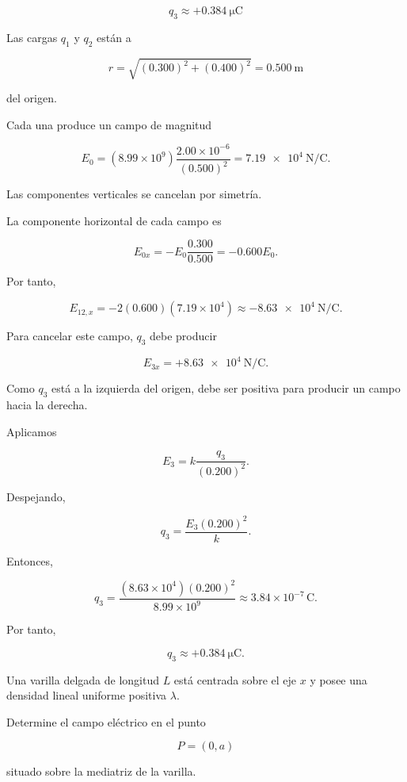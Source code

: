 \begin{respuesta}

\[
\boxed{q_3\approx+\SI{0.384}{\micro\coulomb}}
\]

\end{respuesta}

\begin{explicacion}

Las cargas \(q_1\) y \(q_2\) están a

\[
r=\sqrt{(0.300)^2+(0.400)^2}=\SI{0.500}{\metre}
\]

del origen.

Cada una produce un campo de magnitud

\[
E_0=(8.99\times10^9)\frac{2.00\times10^{-6}}{(0.500)^2}
=\SI{7.19e4}{\newton\per\coulomb}.
\]

Las componentes verticales se cancelan por simetría.

La componente horizontal de cada campo es

\[
E_{0x}=-E_0\frac{0.300}{0.500}
=-0.600E_0.
\]

Por tanto,

\[
E_{12,x}=-2(0.600)(7.19\times10^4)
\approx-\SI{8.63e4}{\newton\per\coulomb}.
\]

Para cancelar este campo, \(q_3\) debe producir

\[
E_{3x}=+\SI{8.63e4}{\newton\per\coulomb}.
\]

Como \(q_3\) está a la izquierda del origen, debe ser positiva para producir un campo hacia la derecha.

Aplicamos

\[
E_3=k\frac{q_3}{(0.200)^2}.
\]

Despejando,

\[
q_3=\frac{E_3(0.200)^2}{k}.
\]

Entonces,

\[
q_3=
\frac{(8.63\times10^4)(0.200)^2}{8.99\times10^9}
\approx3.84\times10^{-7}\,\si{\coulomb}.
\]

Por tanto,

\[
\boxed{q_3\approx+\SI{0.384}{\micro\coulomb}}.
\]

\end{explicacion}


\begin{ejercicio}

Una varilla delgada de longitud \(L\) está centrada sobre el eje \(x\) y posee una densidad lineal uniforme positiva \(\lambda\).

Determine el campo eléctrico en el punto

\[
P=(0,a)
\]

situado sobre la mediatriz de la varilla.

\end{ejercicio}


